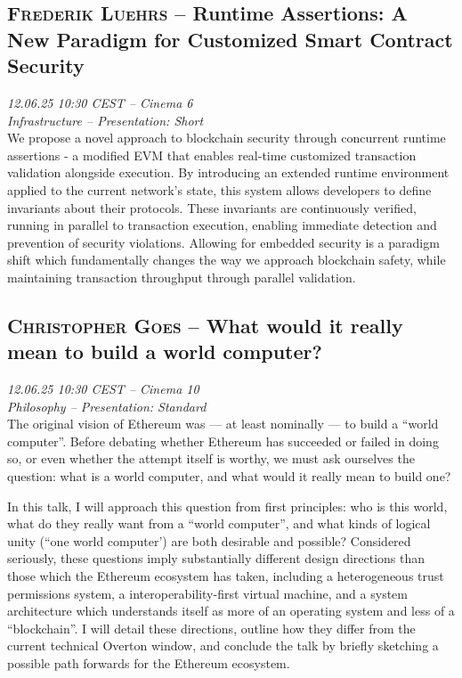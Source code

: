\clearpage
\subsection {\textsc{Frederik Luehrs}  -- Runtime Assertions: A New Paradigm for Customized Smart Contract Security} \noindent \textit {12.06.25 10:30 CEST -- Cinema 6\\ Infrastructure -- Presentation: Short}\\[1em] We propose a novel approach to blockchain security through concurrent runtime assertions - a modified EVM that enables real-time customized transaction validation alongside execution.
By introducing an extended runtime environment applied to the current network's state, this system allows developers to define invariants about their protocols. These invariants are continuously verified, running in parallel to transaction execution, enabling immediate detection and prevention of security violations.
Allowing for embedded security is a paradigm shift which fundamentally changes the way we approach blockchain safety, while maintaining transaction throughput through parallel validation.

\clearpage
\subsection {\textsc{Christopher Goes}  -- What would it really mean to build a world computer?} \noindent \textit {12.06.25 10:30 CEST -- Cinema 10\\ Philosophy -- Presentation: Standard}\\[1em] The original vision of Ethereum was — at least nominally — to build a ``world computer''. Before debating whether Ethereum has succeeded or failed in doing so, or even whether the attempt itself is worthy, we must ask ourselves the question: what is a world computer, and what would it really mean to build one?

In this talk, I will approach this question from first principles: who is this world, what do they really want from a ``world computer'', and what kinds of logical unity (``one world computer') are both desirable and possible? Considered seriously, these questions imply substantially different design directions than those which the Ethereum ecosystem has taken, including a heterogeneous trust permissions system, a interoperability-first virtual machine, and a system architecture which understands itself as more of an operating system and less of a ``blockchain''. I will detail these directions, outline how they differ from the current technical Overton window, and conclude the talk by briefly sketching a possible path forwards for the Ethereum ecosystem.

